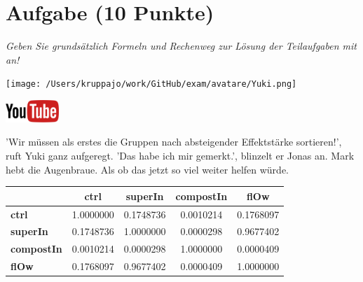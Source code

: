 \documentclass[a4paper, 9pt]{scrartcl}\usepackage[]{graphicx}\usepackage[]{xcolor}
\newenvironment{knitrout}{}{} %
\begin{document}
\section{Aufgabe \hfill (10 Punkte)}

\textit{Geben Sie grundsätzlich Formeln und Rechenweg zur Lösung der Teilaufgaben mit an!} \\[1Ex]
 

 
\begin{minipage}[t]{0.5\textwidth}
\texttt{[image: /Users/kruppajo/work/GitHub/exam/avatare/Yuki.png]}
\end{minipage}
\begin{minipage}[t]{0.5\textwidth}
\hfill
\href{https://youtu.be/RagTFFKFbFg}{\includegraphics[width = 2cm]{img/youtube}}
\end{minipage}
\vspace{1ex}



'Wir müssen als erstes die Gruppen nach absteigender Effektstärke sortieren!', ruft Yuki ganz aufgeregt. 'Das habe ich mir gemerkt.', blinzelt er Jonas an. Mark hebt die Augenbraue. Als ob das jetzt so viel weiter helfen würde.

\begin{knitrout}
\color{fgcolor}\begin{table}[!h]
\centering\begingroup\fontsize{10}{12}\selectfont

\begin{tabular}{>{}lcccc}
\toprule
\textbf{ } & \textbf{ctrl} & \textbf{superIn} & \textbf{compostIn} & \textbf{flOw}\\
\midrule
\textbf{ctrl} & 1.0000000 & 0.1748736 & 0.0010214 & 0.1768097\\
\textbf{superIn} & 0.1748736 & 1.0000000 & 0.0000298 & 0.9677402\\
\textbf{compostIn} & 0.0010214 & 0.0000298 & 1.0000000 & 0.0000409\\
\textbf{flOw} & 0.1768097 & 0.9677402 & 0.0000409 & 1.0000000\\
\bottomrule
\end{tabular}
\endgroup{}
\end{table}

\end{knitrout}
\end{document}
